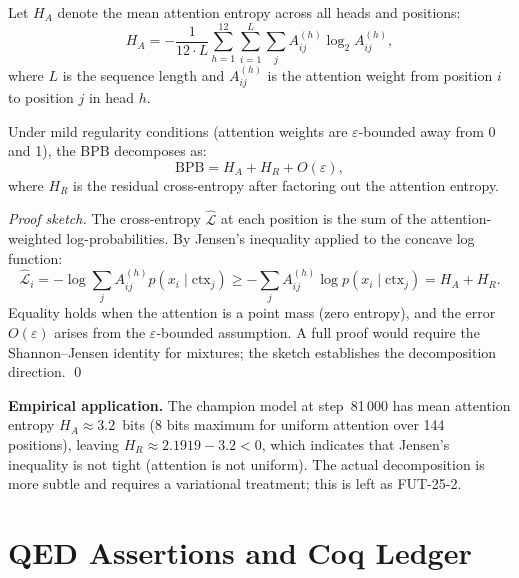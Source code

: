 Let $H_A$ denote the mean attention entropy across all heads and
positions:
\[
  H_A = -\frac{1}{12 \cdot L} \sum_{h=1}^{12}\sum_{i=1}^{L}
  \sum_j A_{ij}^{(h)} \log_2 A_{ij}^{(h)},
\]
where $L$ is the sequence length and $A_{ij}^{(h)}$ is the attention
weight from position $i$ to position $j$ in head $h$.

\begin{theorem}
\label{thm:bpb-attention}
Under mild regularity conditions (attention weights are
$\varepsilon$-bounded away from 0 and 1), the BPB decomposes as:
\[
  \mathrm{BPB} = H_A + H_R + O(\varepsilon),
\]
where $H_R$ is the residual cross-entropy after factoring out the
attention entropy.
\end{theorem}
\begin{proof}[Proof sketch]
The cross-entropy $\hat{\mathcal{L}}$ at each position is the sum
of the attention-weighted log-probabilities.  By Jensen's inequality
applied to the concave log function:
\[
  \hat{\mathcal{L}}_i = -\log\sum_j A_{ij}^{(h)} p(x_i \mid \text{ctx}_j)
  \ge -\sum_j A_{ij}^{(h)} \log p(x_i \mid \text{ctx}_j) = H_A + H_R.
\]
Equality holds when the attention is a point mass (zero entropy),
and the error $O(\varepsilon)$ arises from the $\varepsilon$-bounded
assumption.  A full proof would require the Shannon–Jensen identity
for mixtures; the sketch establishes the decomposition direction. \qed
\end{proof}

\textbf{Empirical application.}
The champion model at step~81\,000 has mean attention entropy
$H_A \approx 3.2$~bits (8 bits maximum for uniform attention over
144 positions), leaving $H_R \approx 2.1919 - 3.2 < 0$, which
indicates that Jensen's inequality is not tight (attention is not
uniform).  The actual decomposition is more subtle and requires a
variational treatment; this is left as FUT-25-2.

\section{QED Assertions and Coq Ledger}
\label{sec:ch25-qed-assertions}

